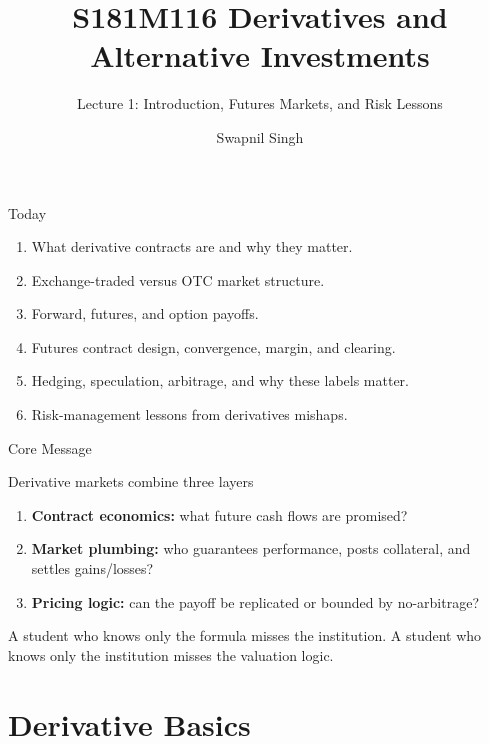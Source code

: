 \documentclass[aspectratio=169,11pt]{beamer}
\title{S181M116 Derivatives and Alternative Investments}
\subtitle{Lecture 1: Introduction, Futures Markets, and Risk Lessons}
\author{Swapnil Singh}
\institute{Lietuvos Bankas and Kaunas University of Technology}
\date{}
\begin{document}
\begin{frame}
    \titlepage
\end{frame}

\begin{frame}{Today}
    \begin{enumerate}
        \item What derivative contracts are and why they matter.
        \item Exchange-traded versus OTC market structure.
        \item Forward, futures, and option payoffs.
        \item Futures contract design, convergence, margin, and clearing.
        \item Hedging, speculation, arbitrage, and why these labels matter.
        \item Risk-management lessons from derivatives mishaps.
    \end{enumerate}
\end{frame}

\begin{frame}{Core Message}
    \begin{block}{Derivative markets combine three layers}
        \begin{enumerate}
            \item \textbf{Contract economics:} what future cash flows are promised?
            \item \textbf{Market plumbing:} who guarantees performance, posts collateral, and settles gains/losses?
            \item \textbf{Pricing logic:} can the payoff be replicated or bounded by no-arbitrage?
        \end{enumerate}
    \end{block}

    \vspace{0.4em}
    A student who knows only the formula misses the institution.
    A student who knows only the institution misses the valuation logic.
\end{frame}

\section{Derivative Basics}
\end{document}
